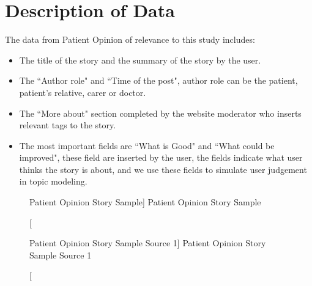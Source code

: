 \documentclass[11pt,twoside]{report}
\begin{document}
\section{Description of Data}
The data from Patient Opinion of relevance to this study includes:
\begin{itemize}
\item The title of the story and the summary of the story by the user.
\item The ``Author role" and ``Time of the post", author role can be the patient, patient’s relative, carer or doctor.
\item The ``More about" section completed by the website moderator who inserts relevant tags to the story.
\item The most important fields are ``What is Good" and 
``What could be improved", these field are inserted by the user, the fields indicate what user thinks the story is about, and we use these fields to simulate user judgement in topic modeling.
\end{itemize}

\begin{figure}[h]
    \begin{center}
    \caption
    [Patient Opinion Story Sample]
    {
    Patient Opinion Story Sample
    \label{Figure1}
    }
    \end{center}
\end{figure}

\begin{figure}[h]
    \begin{center}
    \caption
    [Patient Opinion Story Sample Source 1]
    {
    Patient Opinion Story Sample Source 1
    \label{Figure2}
    }
    \end{center}
\end{figure}
\end{document}
